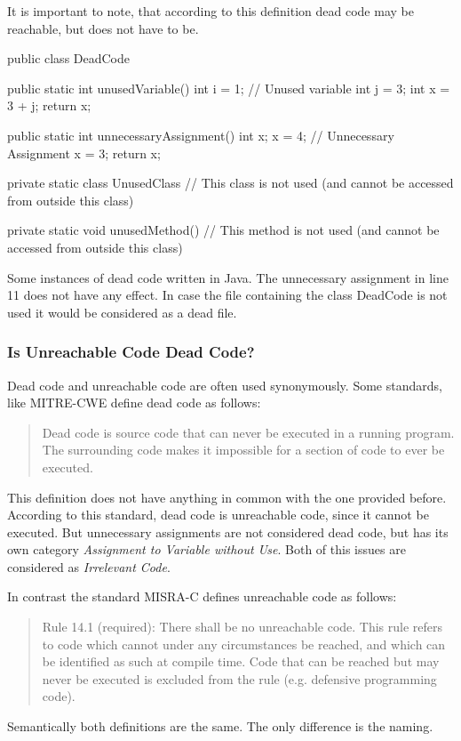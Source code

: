 It is important to note, that according to this definition dead code may be reachable, but does not have to be.



\begin{program}
	\begin{JavaCode}
public class DeadCode {
	public static int unusedVariable() {
		int i = 1; // Unused variable
		int j = 3;
		int x = 3 + j;
		return x;
	}
			
	public static int unnecessaryAssignment() {
		int x;
		x = 4; // Unnecessary Assignment
		x = 3;
		return x;
	}
			
	private static class UnusedClass {
		// This class is not used (and cannot be accessed from outside this class)
	}
			
	private static void unusedMethod() {
		// This method is not used (and cannot be accessed from outside this class)
	}
}\end{JavaCode}
	\caption{Some instances of dead code written in Java. The unnecessary assignment in line 11 does not have any effect. In case the file containing the class DeadCode is not used it would be considered as a dead file.}
	\label{code:dead code}
\end{program}

\subsubsection{Is Unreachable Code Dead Code?}
Dead code and unreachable code are often used synonymously. 
Some standards, like MITRE-CWE \cite{CWECWE561Dead} define dead code as follows:
\begin{quote}
	Dead code is source code that can never be executed in a running program. The surrounding code makes it impossible for a section of code to ever be executed.
\end{quote}
This definition does not have anything in common with the one provided before. According to this standard, dead code is unreachable code, since it cannot be executed. But unnecessary assignments are not considered dead code, but has its own category \emph{Assignment to Variable without Use}.
Both of this issues are considered as \emph{Irrelevant Code}.


In contrast the standard MISRA-C \cite{motorindustrysoftwarereliabilityassociationMISRAC2004Guidelines2008} defines unreachable code as follows:
\begin{quote}
Rule 14.1 (required): There shall be no unreachable code.
This  rule  refers  to  code  which  cannot  under  any  circumstances  be  reached,  and  which  can  be 
identified as such at compile time. Code that can be reached but may never be executed is excluded 
from the rule (e.g. defensive programming code).	
\end{quote}
Semantically both definitions are the same. The only difference is the naming.



